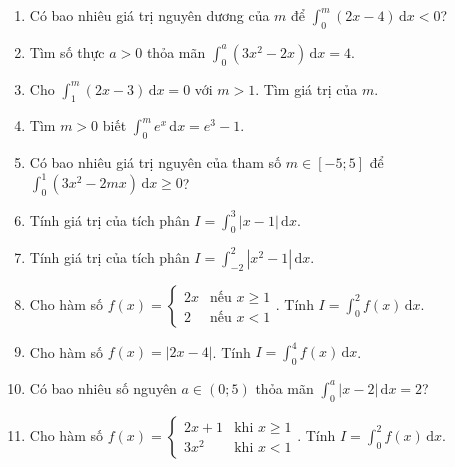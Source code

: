 \documentclass[12pt]{article}
\begin{document}
\begin{enumerate}[label=\textbf{Câu \arabic*.}]
		\item Có bao nhiêu giá trị nguyên dương của $m$ để $\displaystyle \int_0^m (2x - 4)\,\mathrm{d}x < 0$?
		\vspace{0.75cm}
		
		\item Tìm số thực $a > 0$ thỏa mãn $\displaystyle \int_0^a (3x^2 - 2x)\,\mathrm{d}x = 4$.
		\vspace{0.75cm}
		
		\item Cho $\displaystyle \int_1^m (2x - 3)\,\mathrm{d}x = 0$ với $m > 1$. Tìm giá trị của $m$.
		\vspace{0.75cm}
		
		\item Tìm $m > 0$ biết $\displaystyle \int_0^m e^x\,\mathrm{d}x = e^3 - 1$.
		\vspace{0.75cm}
		
		\item Có bao nhiêu giá trị nguyên của tham số $m \in [-5; 5]$ để $\displaystyle \int_0^1 (3x^2 - 2mx)\,\mathrm{d}x \ge 0$?
		\vspace{0.75cm}
		
		\item Tính giá trị của tích phân $I = \displaystyle \int_0^3 |x-1|\,\mathrm{d}x$.
		\vspace{0.75cm}
		
		\item Tính giá trị của tích phân $I = \displaystyle \int_{-2}^2 |x^2 - 1|\,\mathrm{d}x$.
		\vspace{0.75cm}
		
		\item Cho hàm số $f(x) = \begin{cases} 2x & \text{nếu } x \ge 1 \\ 2 & \text{nếu } x < 1 \end{cases}$. Tính $I = \displaystyle \int_0^2 f(x)\,\mathrm{d}x$.
		\vspace{0.75cm}
		
		\item Cho hàm số $f(x) = |2x - 4|$. Tính $I = \displaystyle \int_0^4 f(x)\,\mathrm{d}x$.
		\vspace{0.75cm}
		
		\item Có bao nhiêu số nguyên $a \in (0; 5)$ thỏa mãn $\displaystyle \int_0^a |x-2|\,\mathrm{d}x = 2$?
		\vspace{0.75cm}

		\item Cho hàm số $f(x) = \begin{cases} 2x + 1 & \text{khi } x \ge 1 \\ 3x^2 & \text{khi } x < 1 \end{cases}$. Tính $I = \displaystyle \int_0^2 f(x)\,\mathrm{d}x$.
		\vspace{0.75cm}
		

\end{enumerate}
\end{document}
